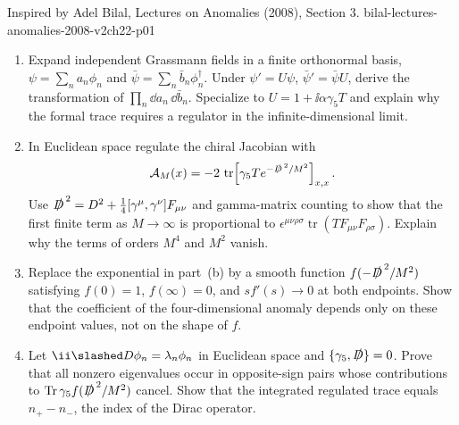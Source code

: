 
\begin{enumerate}
  {Inspired by Adel Bilal, Lectures on Anomalies (2008),
  Section 3.}
  {bilal-lectures-anomalies-2008-v2ch22-p01}
  \begin{enumerate}
    \item[(a)]
    Expand independent Grassmann fields in a finite orthonormal basis,
    \(\psi=\sum_na_n\phi_n\) and
    \(\bar\psi=\sum_n\bar b_n\phi_n^\dagger\).  Under
    \(\psi'=U\psi\), \(\bar\psi'=\bar\psi U\), derive the transformation
    of \(\prod_n \dd a_n\,\dd\bar b_n\).  Specialize to
    \(U=1+\ii\alpha\gamma_5T\) and explain why the formal trace requires a
    regulator in the infinite-dimensional limit.
    \item[(b)]
    In Euclidean space regulate the chiral Jacobian with
    \[
      \mathcal A_M(x)
        =-2\,\operatorname{tr}\!
         \left[\gamma_5T e^{-\slashed D^{\,2}/M^2}\right]_{x,x}.
    \]
    Use
    \(\slashed D^{\,2}=D^2+\tfrac14[\gamma^\mu,\gamma^\nu]F_{\mu\nu}\)
    and gamma-matrix counting to show that the first finite term as
    \(M\to\infty\) is proportional to
    \(\epsilon^{\mu\nu\rho\sigma}
      \operatorname{tr}(T F_{\mu\nu}F_{\rho\sigma})\).
    Explain why the terms of orders \(M^4\) and \(M^2\) vanish.
    \item[(c)]
    Replace the exponential in part~(b) by a smooth function
    \(f(-\slashed D^{\,2}/M^2)\) satisfying
    \(f(0)=1\), \(f(\infty)=0\), and
    \(sf'(s)\to0\) at both endpoints.  Show that the coefficient of the
    four-dimensional anomaly depends only on these endpoint values, not
    on the shape of \(f\).
    \item[(d)]
    Let \(\ii\slashed D\phi_n=\lambda_n\phi_n\) in Euclidean space and
    \(\{\gamma_5,\slashed D\}=0\).  Prove that all nonzero eigenvalues
    occur in opposite-sign pairs whose contributions to
    \(\operatorname{Tr}\gamma_5f(\slashed D^{\,2}/M^2)\) cancel.  Show
    that the integrated regulated trace equals \(n_+-n_-\), the index of
    the Dirac operator.
  \end{enumerate}


\end{enumerate}
